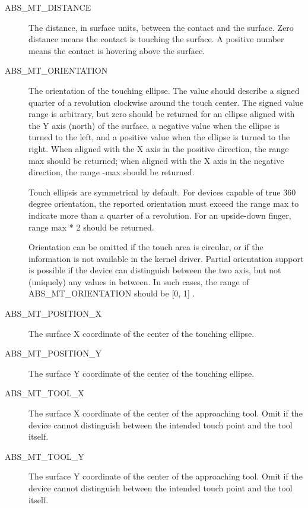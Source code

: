 \documentclass[a4paper,8pt,english]{sphinxmanual}
\begin{document}
\begin{description}
\item[{ABS\_MT\_DISTANCE}] \leavevmode
The distance, in surface units, between the contact and the surface. Zero
distance means the contact is touching the surface. A positive number means
the contact is hovering above the surface.

\item[{ABS\_MT\_ORIENTATION}] \leavevmode
The orientation of the touching ellipse. The value should describe a signed
quarter of a revolution clockwise around the touch center. The signed value
range is arbitrary, but zero should be returned for an ellipse aligned with
the Y axis (north) of the surface, a negative value when the ellipse is
turned to the left, and a positive value when the ellipse is turned to the
right. When aligned with the X axis in the positive direction, the range
max should be returned; when aligned with the X axis in the negative
direction, the range -max should be returned.

Touch ellipsis are symmetrical by default. For devices capable of true 360
degree orientation, the reported orientation must exceed the range max to
indicate more than a quarter of a revolution. For an upside-down finger,
range max * 2 should be returned.

Orientation can be omitted if the touch area is circular, or if the
information is not available in the kernel driver. Partial orientation
support is possible if the device can distinguish between the two axis, but
not (uniquely) any values in between. In such cases, the range of
ABS\_MT\_ORIENTATION should be {[}0, 1{]} \footnotemark[4].

\item[{ABS\_MT\_POSITION\_X}] \leavevmode
The surface X coordinate of the center of the touching ellipse.

\item[{ABS\_MT\_POSITION\_Y}] \leavevmode
The surface Y coordinate of the center of the touching ellipse.

\item[{ABS\_MT\_TOOL\_X}] \leavevmode
The surface X coordinate of the center of the approaching tool. Omit if
the device cannot distinguish between the intended touch point and the
tool itself.

\item[{ABS\_MT\_TOOL\_Y}] \leavevmode
The surface Y coordinate of the center of the approaching tool. Omit if the
device cannot distinguish between the intended touch point and the tool
itself.


\end{description}
\end{document}
